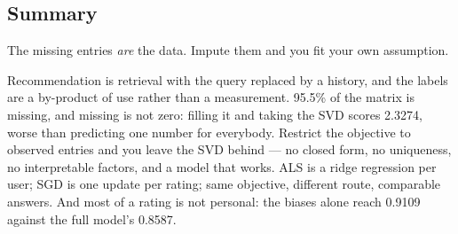\documentclass[11pt,a4paper]{article}
\begin{document}
\subsection{Summary}

\begin{keybox}[title={One line to keep}]
The missing entries \emph{are} the data. Impute them and you fit your own
assumption.
\end{keybox}

Recommendation is retrieval with the query replaced by a history, and the
labels are a by-product of use rather than a measurement. 95.5\% of the matrix
is missing, and missing is not zero: filling it and taking the SVD scores
2.3274, worse than predicting one number for everybody. Restrict the objective
to observed entries and you leave the SVD behind --- no closed form, no
uniqueness, no interpretable factors, and a model that works. ALS is a ridge
regression per user; SGD is one update per rating; same objective, different
route, comparable answers. And most of a rating is not personal: the biases
alone reach 0.9109 against the full model's 0.8587.
\end{document}
